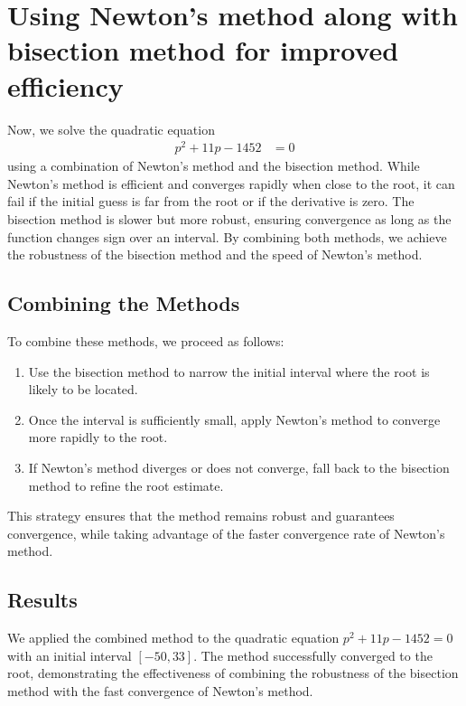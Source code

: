 \documentclass[journal]{IEEEtran}
\begin{document}
\section{Using Newton's method along with bisection method for improved efficiency}
Now, we solve the quadratic equation
\begin{align}
p^2 + 11p - 1452 &= 0
\end{align}
using a combination of Newton's method and the bisection method. While Newton's method is efficient and converges rapidly when close to the root, it can fail if the initial guess is far from the root or if the derivative is zero. The bisection method is slower but more robust, ensuring convergence as long as the function changes sign over an interval. By combining both methods, we achieve the robustness of the bisection method and the speed of Newton's method.


\subsection{Combining the Methods}
To combine these methods, we proceed as follows:
\begin{enumerate}
    \item Use the bisection method to narrow the initial interval where the root is likely to be located.
    \item Once the interval is sufficiently small, apply Newton's method to converge more rapidly to the root.
    \item If Newton's method diverges or does not converge, fall back to the bisection method to refine the root estimate.
\end{enumerate}

This strategy ensures that the method remains robust and guarantees convergence, while taking advantage of the faster convergence rate of Newton's method.

\subsection{Results}
We applied the combined method to the quadratic equation \( p^2 + 11p - 1452 = 0 \) with an initial interval \([-50, 33]\). The method successfully converged to the root, demonstrating the effectiveness of combining the robustness of the bisection method with the fast convergence of Newton's method.
\end{document}

